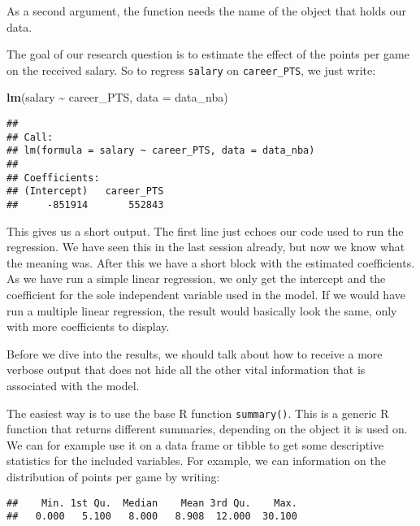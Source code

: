 \documentclass[
]{book}
\newenvironment{Shaded}{\begin{snugshade}}{\end{snugshade}}
\newcommand{\AttributeTok}[1]{\textcolor[rgb]{0.13,0.29,0.53}{#1}}
\newcommand{\FunctionTok}[1]{\textcolor[rgb]{0.13,0.29,0.53}{\textbf{#1}}}
\newcommand{\NormalTok}[1]{#1}
\newcommand{\SpecialCharTok}[1]{\textcolor[rgb]{0.81,0.36,0.00}{\textbf{#1}}}
\begin{document}
As a second argument, the function needs the name of the object that holds our
data.

The goal of our research question is to estimate the effect of the points per
game on the received salary. So to regress \texttt{salary} on \texttt{career\_PTS}, we just
write:

\begin{Shaded}
\begin{Highlighting}[]
\FunctionTok{lm}\NormalTok{(salary }\SpecialCharTok{\textasciitilde{}}\NormalTok{ career\_PTS, }\AttributeTok{data =}\NormalTok{ data\_nba)}
\end{Highlighting}
\end{Shaded}

\begin{verbatim}
## 
## Call:
## lm(formula = salary ~ career_PTS, data = data_nba)
## 
## Coefficients:
## (Intercept)   career_PTS  
##     -851914       552843
\end{verbatim}

This gives us a short output. The first line just echoes our code used to run
the regression. We have seen this in the last session already, but now we know
what the meaning was. After this we have a short block with the estimated
coefficients. As we have run a simple linear regression, we only get the
intercept and the coefficient for the sole independent variable used in the
model. If we would have run a multiple linear regression, the result would
basically look the same, only with more coefficients to display.

Before we dive into the results, we should talk about how to receive a more
verbose output that does not hide all the other vital information that is
associated with the model.

The easiest way is to use the base R function \texttt{summary()}. This is a generic R
function that returns different summaries, depending on the object it is used
on. We can for example use it on a data frame or tibble to get some descriptive
statistics for the included variables. For example, we can information on the
distribution of points per game by writing:

\begin{Shaded}
\end{Shaded}

\begin{verbatim}
##    Min. 1st Qu.  Median    Mean 3rd Qu.    Max. 
##   0.000   5.100   8.000   8.908  12.000  30.100
\end{verbatim}
\end{document}
